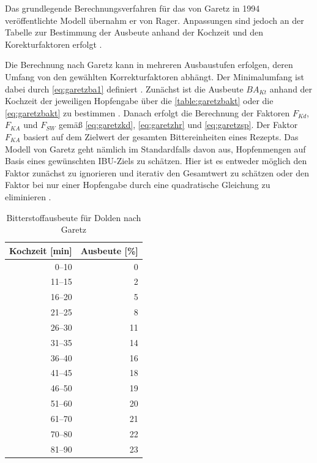 \documentclass[a4paper,parskip=half]{scrartcl}
\newcommand{\BAKt}{{\mathit{BA}}_{\mathit{Kt}}}
\newcommand{\FKd}{F_{\mathit{Kd}}}
\newcommand{\FHR}{F_{\mathit{KA}}}
\newcommand{\FSP}{F_{\mathit{SW}}}
\begin{document}
Das grundlegende Berechnungsverfahren für das von Garetz in 1994 veröffentlichte Modell übernahm er von Rager. Anpassungen sind jedoch an der Tabelle zur Bestimmung der Ausbeute anhand der Kochzeit und den Korekturfaktoren erfolgt \parencite[134-144]{Garetz1994}.

Die Berechnung nach Garetz kann in mehreren Ausbaustufen erfolgen, deren Umfang von den gewählten Korrekturfaktoren abhängt. Der Minimalumfang ist dabei durch \autoref{eq:garetzba1} definiert \parencite[137]{Garetz1994}. Zunächst ist die Ausbeute $\BAKt$ anhand der Kochzeit der jeweiligen Hopfengabe über die \autoref{table:garetzbakt} oder die \autoref{eq:garetzbakt} zu bestimmen \parencite{Steinmeyer2021}. Danach erfolgt die Berechnung der Faktoren $\FKd$, $\FHR$ und $\FSP$ gemäß \autoref{eq:garetzkd}, \autoref{eq:garetzhr} und \autoref{eq:garetzsp}. Der Faktor $\FHR$ basiert auf dem Zielwert der gesamten Bittereinheiten eines Rezepts. Das Modell von Garetz geht nämlich im Standardfalls davon aus, Hopfenmengen auf Basis eines gewünschten IBU-Ziels zu schätzen. Hier ist es entweder möglich den Faktor zunächst zu ignorieren und iterativ den Gesamtwert zu schätzen oder den Faktor bei nur einer Hopfengabe durch eine quadratische Gleichung zu eliminieren \parencite[63]{Hall1997}.

\begin{table}[H]
\centering
\begin{tabular}{rr}
\toprule
\multicolumn{1}{c}{\textbf{Kochzeit [min]}} & \multicolumn{1}{c}{\textbf{Ausbeute [\%]}} \\
\midrule
0–10            & 0 \\
11–15           & 2 \\
16–20           & 5 \\
21–25           & 8 \\
26–30           & 11 \\
31–35           & 14 \\
36–40           & 16 \\
41–45           & 18 \\
46–50           & 19 \\
51–60           & 20 \\
61–70           & 21 \\
70–80           & 22 \\
81–90           & 23 \\
\bottomrule
\end{tabular}
\caption{Bitterstoffausbeute für Dolden nach Garetz \parencite[138]{Garetz1994}}
\label{table:garetzbakt}
\end{table}
\end{document}
